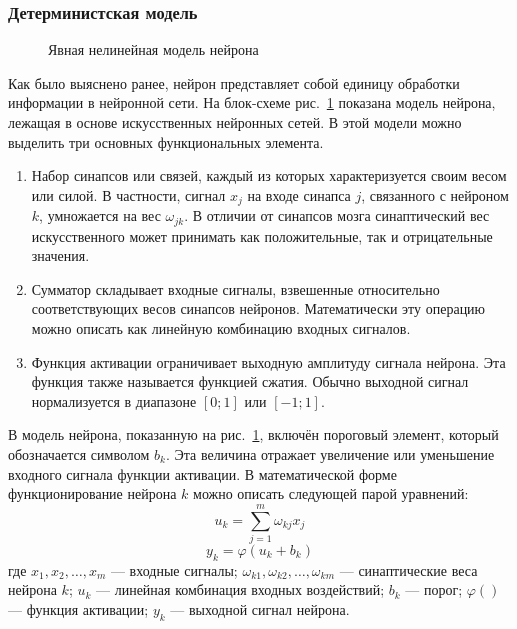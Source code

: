 \subsubsection{Детерминистская модель}
\begin{figure}[ht]
\caption{Явная нелинейная модель нейрона}
\label{ris:BlockScheme}
\end{figure}
Как было выяснено ранее, нейрон представляет собой единицу обработки информации в нейронной сети. 
На блок-схеме рис.~\ref{ris:BlockScheme} показана модель нейрона, лежащая в основе искусственных нейронных сетей.
В этой модели можно выделить три основных функциональных элемента.
\begin{enumerate}
\item Набор синапсов или связей, каждый из которых характеризуется своим весом или силой.
В частности, сигнал $x_j$ на входе синапса $j$, связанного с нейроном $k$, умножается на вес $\omega_{jk}$.
В отличии от синапсов мозга синаптический вес искусственного может принимать как положительные, так и отрицательные значения. 
\item Сумматор складывает входные сигналы, взвешенные относительно соответствующих весов синапсов нейронов.
Математически эту операцию можно описать как линейную комбинацию входных сигналов.
\item Функция активации ограничивает выходную амплитуду сигнала нейрона.
Эта функция также называется функцией сжатия.
Обычно выходной сигнал нормализуется в диапазоне $[0;1]$ или $[-1;1]$.
\end{enumerate}
В модель нейрона, показанную на рис.~\ref{ris:BlockScheme}, включён пороговый элемент, который обозначается символом $b_k$.
Эта величина отражает увеличение или уменьшение входного сигнала функции активации.
В математической форме функционирование нейрона $k$ можно описать следующей парой уравнений:
\begin{equation}
u_k = \sum_{j=1}^{m} \omega_{kj}x_j
\end{equation}
\begin{equation}
y_k = \varphi (u_k + b_k)
\end{equation}
где $x_1,x_2,\dots,x_m$ --- входные сигналы;
$\omega_{k1},\omega_{k2},\dots,\omega_{km}$ --- синаптические веса нейрона $k$;
$u_k$ --- линейная комбинация входных воздействий;
$b_k$ --- порог;
$\varphi()$ --- функция активации;
$y_k$ --- выходной сигнал нейрона.\cite{NejronnyeSeti}
